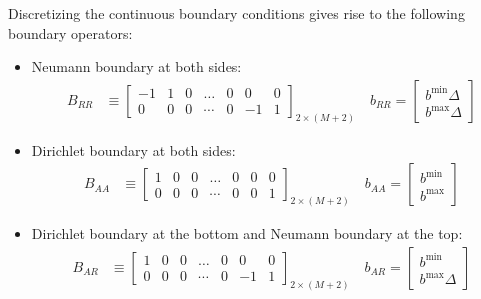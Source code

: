 \documentclass[11pt]{article}
\begin{document}
Discretizing the continuous boundary conditions gives rise to the following boundary operators:
\begin{itemize}
\item Neumann boundary at both sides:
\begin{align}
	B_{RR} &\equiv \begin{bmatrix}
	-1&1&0&\dots&0&0&0\\
	0&0&0&\cdots&0&-1&1
	\end{bmatrix}_{2\times (M+2)}\quad
	b_{RR} = \begin{bmatrix}b^{\min}\Delta\\b^{\max}\Delta\end{bmatrix}\label{eq:B-RR}
\end{align}
\item Dirichlet boundary at both sides:
\begin{align}
	B_{AA} &\equiv \begin{bmatrix}
	1&0&0&\dots&0&0&0\\
	0&0&0&\cdots&0&0&1
	\end{bmatrix}_{2\times (M+2)}\quad
	b_{AA} = \begin{bmatrix}b^{\min}\\b^{\max}\end{bmatrix}\label{eq:B-AA}
\end{align}
\item Dirichlet boundary at the bottom and Neumann boundary at the top:
\begin{align}
	B_{AR} &\equiv \begin{bmatrix}
	1&0&0&\dots&0&0&0\\
	0&0&0&\cdots&0&-1&1
	\end{bmatrix}_{2\times (M+2)}\quad
	b_{AR} = \begin{bmatrix}b^{\min}\\b^{\max}\Delta\end{bmatrix}\label{eq:B-AR}
\end{align}
\end{itemize}
\end{document}

